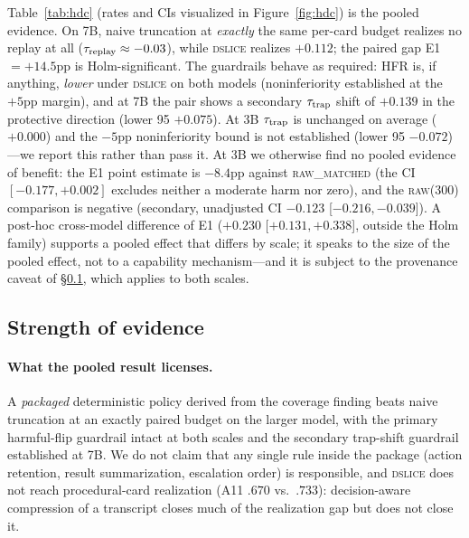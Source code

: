 Table~\ref{tab:hdc} (rates and CIs visualized in Figure~\ref{fig:hdc}) is the pooled evidence. On 7B, naive truncation at \emph{exactly} the same per-card budget realizes no replay at all ($\tau_{\mathrm{replay}}\approx-0.03$), while \textsc{dslice} realizes $+0.112$; the paired gap E1 $=+14.5$pp is Holm-significant. The guardrails behave as required: HFR is, if anything, \emph{lower} under \textsc{dslice} on both models (noninferiority established at the $+5$pp margin), and at 7B the pair shows a secondary $\tau_{\mathrm{trap}}$ shift of $+0.139$ in the protective direction (lower 95 $+0.075$). At 3B $\tau_{\mathrm{trap}}$ is unchanged on average ($+0.000$) and the $-5$pp noninferiority bound is not established (lower 95 $-0.072$)---we report this rather than pass it. At 3B we otherwise find no pooled evidence of benefit: the E1 point estimate is $-8.4$pp against \textsc{raw\_matched} (the CI $[-0.177,+0.002]$ excludes neither a moderate harm nor zero), and the \textsc{raw(300)} comparison is negative (secondary, unadjusted CI $-0.123$ [$-0.216,-0.039$]). A post-hoc cross-model difference of E1 ($+0.230$ [$+0.131,+0.338$], outside the Holm family) supports a pooled effect that differs by scale; it speaks to the size of the pooled effect, not to a capability mechanism---and it is subject to the provenance caveat of \S\ref{ssec:dcstrength}, which applies to both scales.

\subsection{Strength of evidence}
\label{ssec:dcstrength}

\paragraph{What the pooled result licenses.} A \emph{packaged} deterministic policy derived from the coverage finding beats naive truncation at an exactly paired budget on the larger model, with the primary harmful-flip guardrail intact at both scales and the secondary trap-shift guardrail established at 7B. We do not claim that any single rule inside the package (action retention, result summarization, escalation order) is responsible, and \textsc{dslice} does not reach procedural-card realization (A11 $.670$ vs.\ $.733$): decision-aware compression of a transcript closes much of the realization gap but does not close it.

